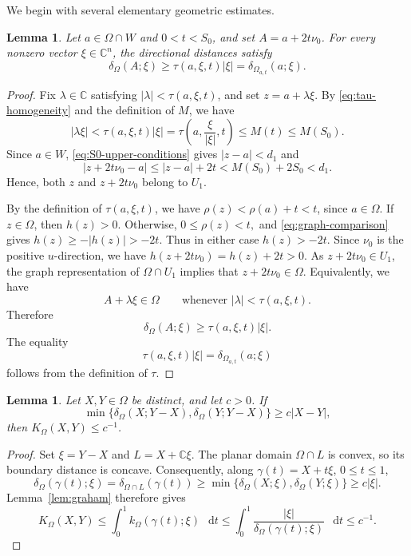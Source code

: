 \documentclass[11pt]{article}
\newtheorem{lemma}[theorem]{Lemma}
\theoremstyle{definition}
\newcommand{\C}{\mathbb{C}}
\newcommand{\dd}{\mathop{}\!\mathrm{d}}
\begin{document}
We begin with several elementary geometric estimates.



\begin{lemma}\label{lem:translated-disc}
	Let \(a\in\Omega\cap W\) and \(0<t<S_0\), and set
	\(A=a+2t\nu_0\).
	For every nonzero vector \(\xi\in\C^n\), the directional distances
	satisfy
	\begin{equation*}
		\delta_\Omega(A;\xi)
		\ge
		\tau(a,\xi,t)|\xi|
		=
		\delta_{\Omega_{a,t}}(a;\xi).
	\end{equation*}
\end{lemma}

\begin{proof}
	Fix \(\lambda\in\C\) satisfying
	\(|\lambda|<\tau(a,\xi,t)\),
	and set \(z=a+\lambda\xi\).
	By \eqref{eq:tau-homogeneity} and the definition of \(M\), we have
	\[
	|\lambda\xi|
	<
	\tau(a,\xi,t)|\xi|
	=
	\tau\left(a,\frac{\xi}{|\xi|},t\right)
	\le
	M(t)
	\le
	M(S_0).
	\]
	Since \(a\in W\), \eqref{eq:S0-upper-conditions} gives
	\(
	|z-a|<d_1
	\)
	and
	\[
	|z+2t\nu_0-a|
	\le
	|z-a|+2t
	<
	M(S_0)+2S_0
	<
	d_1.
	\]
	Hence, both \(z\) and \(z+2t\nu_0\) belong to \(U_1\).
	
	By the definition of \(\tau(a,\xi,t)\), we have
	\(\rho(z)<\rho(a)+t<t\),
	since \(a\in\Omega\).  If \(z\in\Omega\), then \(h(z)>0\).
	Otherwise,
	\(
	0\le\rho(z)<t,
	\)
	and \eqref{eq:graph-comparison} gives
	\(h(z)\ge-|h(z)|>-2t\).
	Thus in either case
	\(
	h(z)>-2t.
	\)
	Since \(\nu_0\) is the positive \(u\)-direction, we have
	\(h(z+2t\nu_0) = h(z)+2t > 0\).
	As \(z+2t\nu_0\in U_1\), the graph representation of
	\(\Omega\cap U_1\) implies that
	\(
	z+2t\nu_0\in\Omega.
	\)
	Equivalently, we have
	\[
	A+\lambda\xi\in\Omega
	\qquad
	\text{whenever }
	|\lambda|<\tau(a,\xi,t).
	\]
	Therefore
	\[
	\delta_\Omega(A;\xi)
	\ge
	\tau(a,\xi,t)|\xi|.
	\]
	The equality
	\[
	\tau(a,\xi,t)|\xi|
	=
	\delta_{\Omega_{a,t}}(a;\xi)
	\]
	follows from the definition of \(\tau\).
\end{proof}


\begin{lemma}\label{lem:horizontal-segment}
Let \(X,Y\in\Omega\) be distinct, and let \(c>0\). If
\[
\min\{\delta_\Omega(X;Y-X),\delta_\Omega(Y;Y-X)\}
\ge c|X-Y|,
\]
then \(K_\Omega(X,Y)\le c^{-1}\).
\end{lemma}
\begin{proof}
Set \(\xi=Y-X\) and \(L=X+\C\xi\). The planar domain
\(\Omega\cap L\) is convex, so its boundary distance is concave.
Consequently, along \(\gamma(t)=X+t\xi\), \(0\le t\le1\),
\[
\delta_\Omega(\gamma(t);\xi)
=\delta_{\Omega\cap L}(\gamma(t))
\ge\min\{\delta_\Omega(X;\xi),\delta_\Omega(Y;\xi)\}
\ge c|\xi|.
\]
Lemma~\ref{lem:graham} therefore gives
\[
K_\Omega(X,Y)\le
\int_0^1 k_\Omega(\gamma(t);\xi)\,\dd t
\le\int_0^1\frac{|\xi|}{\delta_\Omega(\gamma(t);\xi)}\,\dd t
\le c^{-1}.
\]
\end{proof}
\end{document}
